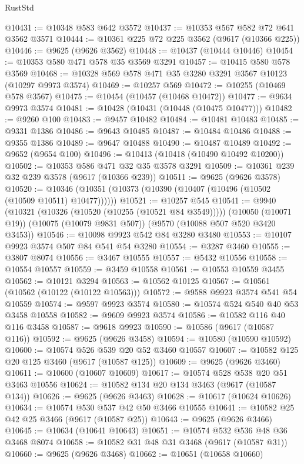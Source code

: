 \begin{lexlean}{RustStd}
\begin{coremodule}
@10431 := @10348 @583 @642 @3572
@10437 := @10353 @567 @582 @72 @641 @3562 @3571
@10444 := @10361 @225 @72 @225 @3562 (@9617 (@10366 @225))
@10446 := @9625 (@9626 @3562)
@10448 := @10437 (@10444 @10446)
@10454 := @10353 @580 @471 @578 @35 @3569 @3291
@10457 := @10415 @580 @578 @3569
@10468 := @10328 @569 @578 @471 @35 @3280 @3291 @3567 @10123 (@10297 @9973 @3574)
@10469 := @10257 @569
@10472 := @10255 (@10469 @578 @3567)
@10475 := @10454 (@10457 (@10468 @10472))
@10477 := @9634 @9973 @3574
@10481 := @10428 (@10431 (@10448 (@10475 @10477)))
@10482 := @9260 @100
@10483 := @9457 @10482
@10484 := @10481 @10483
@10485 := @9331 @1386
@10486 := @9643 @10485
@10487 := @10484 @10486
@10488 := @9355 @1386
@10489 := @9647 @10488
@10490 := @10487 @10489
@10492 := @9652 (@9654 @100)
@10496 := @10413 (@10418 (@10490 @10492 @10200))
@10502 := @10353 @586 @471 @32 @35 @3578 @3291
@10509 := @10361 @239 @32 @239 @3578 (@9617 (@10366 @239))
@10511 := @9625 (@9626 @3578)
@10520 := @10346 (@10351 (@10373 (@10390 (@10407 (@10496 (@10502 (@10509 @10511) @10477))))))
@10521 := @10257 @545
@10541 := @9940
    (@10321 (@10326 (@10520 (@10255 (@10521 @84 @3549)))))
    (@10050 (@10071 @19))
    (@10075 (@10079 @9831 @507))
    (@9570 (@10088 @507 @520 @3420 @3453))
@10546 := @10098 @9923 @542 @84 @3280 @3480
@10553 := @10107 @9923 @3574 @507 @84 @541 @54 @3280
@10554 := @3287 @3460
@10555 := @3807 @8074
@10556 := @3467 @10555
@10557 := @5432 @10556
@10558 := @10554 @10557
@10559 := @3459 @10558
@10561 := @10553 @10559 @3455
@10562 := @10121 @3294
@10563 := @10562 @10125
@10567 := @10561 (@10562 (@10122 (@10122 @10563)))
@10572 := @9588 @9923 @3574 @541 @54 @10559
@10574 := @9597 @9923 @3574
@10580 := @10574 @524 @540 @40 @53 @3458 @10558
@10582 := @9609 @9923 @3574
@10586 := @10582 @116 @40 @116 @3458
@10587 := @9618 @9923
@10590 := @10586 (@9617 (@10587 @116))
@10592 := @9625 (@9626 @3458)
@10594 := @10580 (@10590 @10592)
@10600 := @10574 @526 @539 @20 @52 @3460 @10557
@10607 := @10582 @125 @20 @125 @3460 (@9617 (@10587 @125))
@10609 := @9625 (@9626 @3460)
@10611 := @10600 (@10607 @10609)
@10617 := @10574 @528 @538 @20 @51 @3463 @10556
@10624 := @10582 @134 @20 @134 @3463 (@9617 (@10587 @134))
@10626 := @9625 (@9626 @3463)
@10628 := @10617 (@10624 @10626)
@10634 := @10574 @530 @537 @42 @50 @3466 @10555
@10641 := @10582 @25 @42 @25 @3466 (@9617 (@10587 @25))
@10643 := @9625 (@9626 @3466)
@10645 := @10634 (@10641 @10643)
@10651 := @10574 @532 @536 @48 @36 @3468 @8074
@10658 := @10582 @31 @48 @31 @3468 (@9617 (@10587 @31))
@10660 := @9625 (@9626 @3468)
@10662 := @10651 (@10658 @10660)

\end{coremodule}
\end{lexlean}
